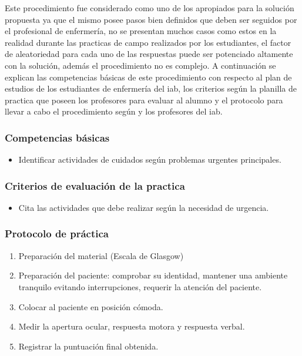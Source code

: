 Este procedimiento fue considerado como uno de los apropiados para la solución propuesta ya que el mismo
posee pasos bien definidos que deben ser seguidos por el profesional de enfermería, no se presentan
muchos casos como estos en la realidad durante las practicas de campo realizados por los estudiantes,
el factor de aleatoriedad para cada uno de las respuestas puede ser potenciado altamente con la solución,
además el procedimiento no es complejo. A continuación se explican las competencias básicas de este
procedimiento con respecto al plan de estudios de los estudiantes de enfermería del \Gls{iab}, los criterios
según la planilla de practica que poseen los profesores para evaluar al alumno y el protocolo para llevar a 
cabo el procedimiento según \cite{protocolo} y los profesores del \Gls{iab}.

\subsubsection{Competencias básicas}
\begin{itemize}
\item Identificar actividades de cuidados según problemas urgentes principales.
\end{itemize}

\subsubsection{Criterios de evaluación de la practica}
\begin{itemize}
\item Cita las actividades que debe realizar según la necesidad de urgencia. 
\end{itemize}


\subsubsection{Protocolo de práctica}

\begin{enumerate}
\item Preparación del material (Escala de Glasgow)
\item Preparación del paciente: comprobar su identidad, mantener una ambiente tranquilo evitando interrupciones, 
requerir la atención del paciente.
\item Colocar al paciente en posición cómoda.
\item Medir la apertura ocular, respuesta motora y respuesta verbal.
\item Registrar la puntuación final obtenida.
\end{enumerate}

